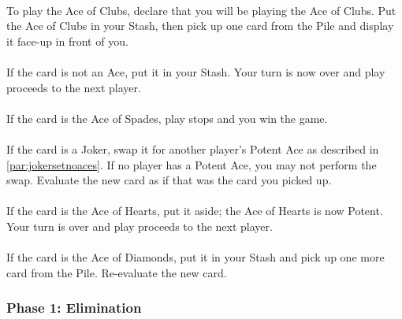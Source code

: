\documentclass{article}
\begin{document}
\paragraph{\label{par:playclubs}}
To play the Ace of Clubs, declare that you will be playing the Ace of
Clubs. Put the Ace of Clubs in your Stash, then pick up one card from
the Pile and display it face-up in front of you.

\paragraph{\label{par:playclubsregular}}
If the card is not an Ace, put it in your Stash. Your turn is now over
and play proceeds to the next player.

\paragraph{\label{par:playclubsspades}}
If the card is the Ace of Spades, play stops and you win the game.

\paragraph{\label{par:playclubsjoker}}
If the card is a Joker, swap it for another player's Potent Ace as
described in \autoref{par:jokersetnoaces}. If no player has a Potent Ace,
you may not perform the swap. Evaluate the new card as if that was the
card you picked up.

\paragraph{\label{par:playclubshearts}}
If the card is the Ace of Hearts, put it aside; the Ace of Hearts is now
Potent. Your turn is over and play proceeds to the next player.

\paragraph{\label{par:playclubsdiamonds}}
If the card is the Ace of Diamonds, put it in your Stash and pick up one
more card from the Pile. Re-evaluate the new card.


\subsubsection{Phase 1: Elimination \label{sec:elimination}}
\end{document}
